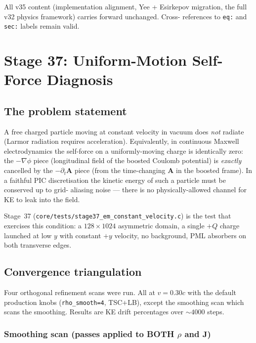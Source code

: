 \documentclass[11pt,a4paper]{article}
\newcommand{\vv}[1]{\mathbf{#1}}
\begin{document}
All v35 content (implementation alignment, Yee + Esirkepov migration,
the full v32 physics framework) carries forward unchanged.  Cross-
references to \texttt{eq:} and \texttt{sec:} labels remain valid.

\newpage

\section{Stage 37: Uniform-Motion Self-Force Diagnosis}
\label{sec:stage37_diagnosis}

\subsection{The problem statement}

A free charged particle moving at constant velocity in vacuum does
\emph{not} radiate (Larmor radiation requires acceleration).
Equivalently, in continuous Maxwell electrodynamics the self-force on
a uniformly-moving charge is identically zero: the $-\nabla\phi$ piece
(longitudinal field of the boosted Coulomb potential) is \emph{exactly}
cancelled by the $-\partial_t\vv{A}$ piece (from the time-changing
$\vv{A}$ in the boosted frame).  In a faithful PIC discretisation the
kinetic energy of such a particle must be conserved up to grid-
aliasing noise --- there is no physically-allowed channel for KE to
leak into the field.

Stage~37 (\texttt{core/tests/stage37\_em\_constant\_velocity.c}) is
the test that exercises this condition: a $128 \times 1024$ asymmetric
domain, a single $+Q$ charge launched at low $y$ with constant $+y$
velocity, no background, PML absorbers on both transverse edges.

\subsection{Convergence triangulation}

Four orthogonal refinement scans were run.  All at $v=0.30c$ with the
default production knobs (\texttt{rho\_smooth=4}, TSC$+$LB), except
the smoothing scan which scans the smoothing.  Results are KE drift
percentages over $\sim 4000$ steps.

\subsubsection*{Smoothing scan (passes applied to BOTH $\rho$ and $\vv{J}$)}
\end{document}
